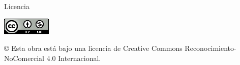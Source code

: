 \newpage
\thispagestyle{empty}

\bigskip
\begin{LARGE}
Licencia
\end{LARGE}








\begin{center}
\includegraphics[scale=1.8]{figures/by-nc_88x31}\\[5mm]
\end{center}

\begin{large}
© Esta obra está bajo una licencia de Creative Commons Reconocimiento-NoComercial 4.0 Internacional.
\end{large}


